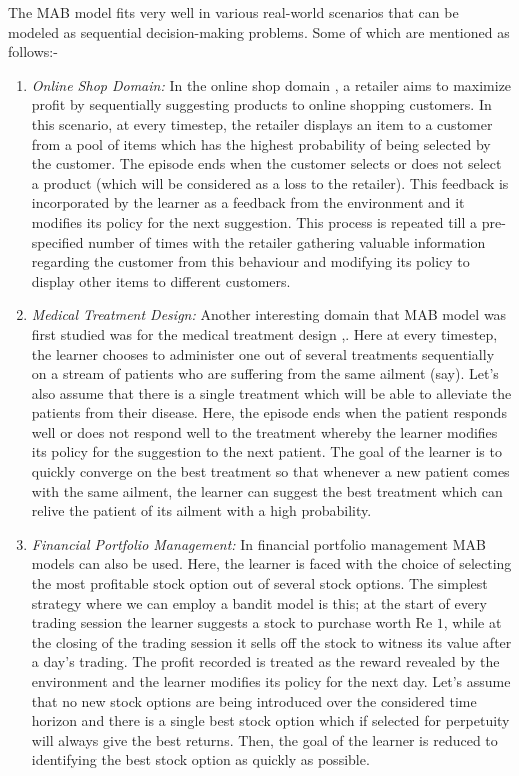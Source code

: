 
The MAB model fits very well in various real-world scenarios that can be modeled as sequential decision-making problems. Some of which are mentioned as follows:-
\begin{enumerate}
\item \emph{Online Shop Domain:} In the online shop domain \cite{ghavamzadeh2015bayesian}, a retailer aims to maximize profit by sequentially suggesting products to online shopping customers. In this scenario, at every timestep, the retailer displays an item to a customer from a pool of items which has the highest probability of being selected by the customer. The episode ends when the customer selects or does not select a product (which will be considered as a loss to the retailer). This feedback is incorporated by the learner as a feedback from the environment and it modifies its policy for the next suggestion. This process is repeated till a pre-specified number of times with the retailer gathering valuable information regarding the customer from this behaviour and modifying its policy to display other items to different customers.
\item \emph{Medical Treatment Design:} Another interesting domain that MAB model was first studied was for the medical treatment design \cite{thompson1933likelihood},\cite{thompson1935theory}. Here at every timestep, the learner chooses to administer one out of several treatments sequentially on a stream of patients who are suffering from the same ailment (say). Let's also assume that there is a single treatment which will be able to alleviate the patients from their disease. Here, the episode ends when the patient responds well or does not respond well to the treatment whereby the learner modifies its policy for the suggestion to the next patient. The goal of the learner is to quickly converge on the best treatment so that whenever a new patient comes with the same ailment, the learner can suggest the best treatment which can relive the patient of its ailment with a high probability.
\item \emph{Financial Portfolio Management:} In financial portfolio management MAB models can also be used. Here, the learner is faced with the choice of selecting the most profitable stock option out of several stock options. The simplest strategy where we can employ a bandit model is this; at the start of every trading session the learner suggests a stock to purchase worth Re $1$, while at the closing of the trading session it sells off the stock to witness its value after a day's trading. The  profit recorded is treated as the reward revealed by the environment and the learner modifies its policy for the next day. Let's assume that no new stock options are being introduced over the considered time horizon and there is a single best stock option which if selected for perpetuity will always give the best returns. Then, the goal of the learner is reduced to identifying the best stock option as quickly as possible. 

\end{enumerate}
